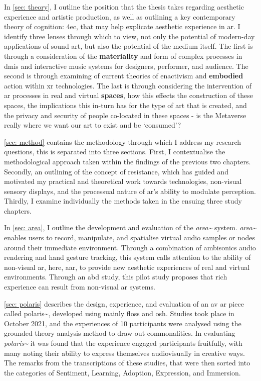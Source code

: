 In \autoref{sec: theory}, I outline the position that the thesis takes regarding aesthetic experience and artistic production, as well as outlining a key contemporary theory of cognition: \gls{4ec}, that may help explicate aesthetic experience in \gls{ar}. I identify three lenses through which to view, not only the potential of modern-day applications of sound \gls{art}, but also the potential of the medium itself. The first is through a consideration of the \textbf{materiality} and form of complex processes in \glspl{dmi} and interactive music systems for designers, performer, and audience. The second is through examining of current theories of enactivism and \textbf{embodied} action within \gls{xr} technologies. The last is through considering the intervention of \gls{ar} processes in real and virtual \textbf{spaces}, how this effects the construction of these spaces, the implications this in-turn has for the type of art that is created, and the privacy and security of people co-located in these spaces - is the Metaverse really where we want our \gls{art} to exist and be `consumed'? 

\autoref{sec: method} contains the methodology through which I address my research questions, this is separated into three sections. First, I contextualise the methodological approach taken within the findings of the previous two chapters. Secondly, an outlining of the concept of resistance, which has guided and motivated my practical and theoretical work towards  technologies, non-visual sensory displays, and the processual nature of \gls{ar}'s ability to modulate perception. Thirdly, I examine individually the methods taken in the ensuing three study chapters.
 
In \autoref{sec: area}, I outline the development and evaluation of the \textit{area\textasciitilde{}} system. \textit{area\textasciitilde{}} enables users to record, manipulate, and spatialise virtual audio samples or nodes around their immediate environment. Through a combination of ambisonics audio rendering and hand gesture tracking, this system calls attention to the ability of non-visual \gls{ar}, here, \gls{aar}, to provide new aesthetic experiences of real and virtual environments. Through an \gls{abd} study, this pilot study proposes that rich experience can result from non-visual \gls{ar} systems. 

\autoref{sec: polaris} describes the design, experience, and evaluation of an \gls{av} \gls{ar} piece called {polaris\textasciitilde{}}, developed using mainly \gls{floss} and \gls{osh}. Studies took place in October 2021, and the experiences of 10 participants were analysed using the grounded theory analysis method to draw out commonalities. In evaluating \textit{polaris\textasciitilde{}} it was found that the experience engaged participants fruitfully, with many noting their ability to express themselves audiovisually in creative ways. The remarks from the transcriptions of these studies, that were then sorted into the categories of Sentiment, Learning, Adoption, Expression, and Immersion. 

